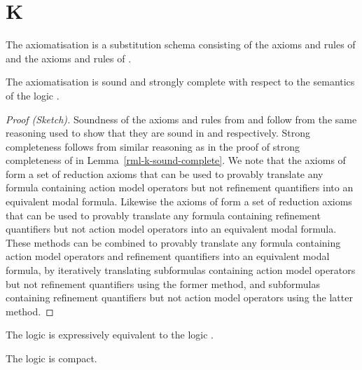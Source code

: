 \section{K}

\begin{definition}
The axiomatisation \axiomAamlK{} is a substitution schema consisting of the axioms and rules of \axiomAmlK{} and the axioms and rules of \axiomRmlK{}.
\end{definition}

\begin{theorem}\label{aaml-k-sound-complete}
The axiomatisation \axiomRmlK{} is sound and strongly complete with respect to the semantics of the logic \logicAamlK{}.
\end{theorem}

\begin{proof}[Proof (Sketch)]
Soundness of the axioms and rules from \axiomAmlK{} and \axiomRmlK{} follow from the same reasoning used to show that they are sound in \logicAmlK{} and \logicRmlK{} respectively.
Strong completeness follows from similar reasoning as in the proof of strong completeness of \axiomRmlK{} in Lemma~\ref{rml-k-sound-complete}.
We note that the axioms of \axiomAmlK{} form a set of reduction axioms that can be used to provably translate any formula containing action model operators but not refinement quantifiers into an equivalent modal formula.
Likewise the axioms of \axiomRmlK{} form a set of reduction axioms that can be used to provably translate any formula containing refinement quantifiers but not action model operators into an equivalent modal formula.
These methods can be combined to provably translate any formula containing action model operators and refinement quantifiers into an equivalent modal formula, by iteratively translating subformulas containing action model operators but not refinement quantifiers using the former method, and subformulas containing refinement quantifiers but not action model operators using the latter method.
\end{proof}

\begin{corollary}\label{aaml-k-expressive-equivalence}
The logic \logicAamlK{} is expressively equivalent to the logic \logicK{}.
\end{corollary}

\begin{corollary}
The logic \logicAamlK{} is compact.
\end{corollary}

